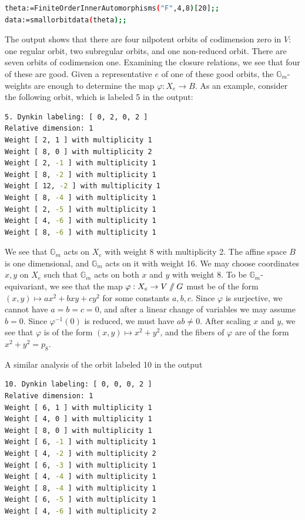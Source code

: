 \documentclass{article} %
\numberwithin{equation}{section}
\theoremstyle{definition}
\newcommand{\GIT}{\mathbin{/\mkern-6mu/}}
\newcommand{\bG}{\mathbb G}
\begin{document}
\begin{lstlisting}[language=bash]
theta:=FiniteOrderInnerAutomorphisms("F",4,8)[20];;
data:=smallorbitdata(theta);;
\end{lstlisting}


The output shows that there are four nilpotent orbits of codimension zero in $V$: one regular orbit, two subregular orbits, and one non-reduced orbit. There are seven orbits of codimension one. Examining the closure relations, we see that four of these are good. Given a representative $e$ of one of these good orbits, the $\bG_m$-weights are enough to determine the map $\varphi: X_e \to B$. As an example, consider the following orbit, which is labeled 5 in the output:

\begin{lstlisting}[language=bash]
5. Dynkin labeling: [ 0, 2, 0, 2 ]
Relative dimension: 1
Weight [ 2, 1 ] with multiplicity 1
Weight [ 8, 0 ] with multiplicity 2
Weight [ 2, -1 ] with multiplicity 1
Weight [ 8, -2 ] with multiplicity 1
Weight [ 12, -2 ] with multiplicity 1
Weight [ 8, -4 ] with multiplicity 1
Weight [ 2, -5 ] with multiplicity 1
Weight [ 4, -6 ] with multiplicity 1
Weight [ 8, -6 ] with multiplicity 1
\end{lstlisting}

We see that $\bG_m$ acts on $X_e$ with weight $8$ with multiplicity 2. The affine space $B$ is one dimensional, and $\bG_m$ acts on it with weight 16. We may choose coordinates $x, y$ on $X_e$ such that $\bG_m$ acts on both $x$ and $y$ with weight $8$. To be $\bG_m$-equivariant, we see that the map $\varphi: X_e \to V\GIT G$ must be of the form $(x, y) \mapsto ax^2 + bxy + cy^2$ for some constants $a, b, c$. Since $\varphi$ is surjective, we cannot have $a = b = c = 0$, and after a linear change of variables we may assume $b = 0$. Since $\varphi^{-1}(0)$ is reduced, we must have $ab \neq 0$. After scaling $x$ and $y$, we see that $\varphi$ is of the form $(x, y) \mapsto x^2 + y^2$, and the fibers of $\varphi$ are of the form $x^2 + y^2 = p_8$.  

A similar analysis of the orbit labeled 10 in the output

\begin{lstlisting}[language=bash]
10. Dynkin labeling: [ 0, 0, 0, 2 ]
Relative dimension: 1
Weight [ 6, 1 ] with multiplicity 1
Weight [ 4, 0 ] with multiplicity 1
Weight [ 8, 0 ] with multiplicity 1
Weight [ 6, -1 ] with multiplicity 1
Weight [ 4, -2 ] with multiplicity 2
Weight [ 6, -3 ] with multiplicity 1
Weight [ 4, -4 ] with multiplicity 1
Weight [ 8, -4 ] with multiplicity 1
Weight [ 6, -5 ] with multiplicity 1
Weight [ 4, -6 ] with multiplicity 2
\end{lstlisting}
\end{document}
